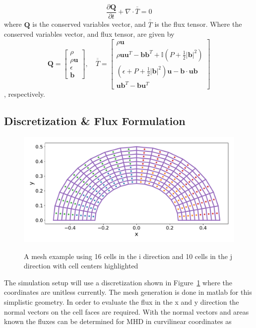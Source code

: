 \documentclass[paper=a4, fontsize=11pt]{scrartcl}
\newcommand*{\rttensor}[1]{\overline{\overline{#1}}}
\newcommand{\pfrac}[2]{\frac{\partial#1}{\partial#2}}
\numberwithin{equation}{section}                %
\numberwithin{figure}{section}                  %
\numberwithin{table}{section}                           %
\begin{document}
\begin{equation}\label{eqn:mhdvector}
  \pfrac{\mathbf{Q}}{t} + \nabla \cdot \rttensor{T} = 0
\end{equation}
where $\mathbf{Q}$ is the conserved variables vector, and $\rttensor{T}$ is the flux tensor. Where the conserved variables vector, and flux tensor, are given by
\[
  \mathbf{Q}=
  \begin{bmatrix}
    \rho  \\
    \rho \mathbf{u}  \\
    \epsilon\\
    \mathbf{b} 
  \end{bmatrix}
  ,\quad \rttensor{T} =
  \begin{bmatrix}
    \rho \mathbf{u}  \\
    \rho \mathbf{u}\mathbf{u}^T - \mathbf{b}\mathbf{b}^T + \mathbb{I}\left(P + \frac{1}{2}|\mathbf{b}|^2\right)\\
    \left(\epsilon + P + \frac{1}{2}|\mathbf{b}|^2\right)\mathbf{u}- \mathbf{b}\cdot\mathbf{u}\mathbf{b}\\
    \mathbf{u}\mathbf{b}^T-\mathbf{b}\mathbf{u}^T
  \end{bmatrix}
\]
, respectively. 

\subsection{Discretization \& Flux Formulation}
  \begin{figure}[!htb]
    \centering
    \includegraphics[width=0.8\linewidth]{fig/16x10mesh}\label{fig:ovrvw:mesh}
    \caption{A mesh example using 16 cells in the i direction and 10 cells in the j direction with cell centers highlighted}
  \end{figure}

The simulation setup will use a discretization shown in Figure~\ref{fig:ovrvw:mesh} where the coordinates are unitless currently. The mesh generation is done in matlab for this simplistic geometry. In order to evaluate the flux in the x and y direction the normal vectors on the cell faces are required. With the normal vectors and areas known the fluxes can be determined for MHD in curvilinear coordinates as
\end{document}
